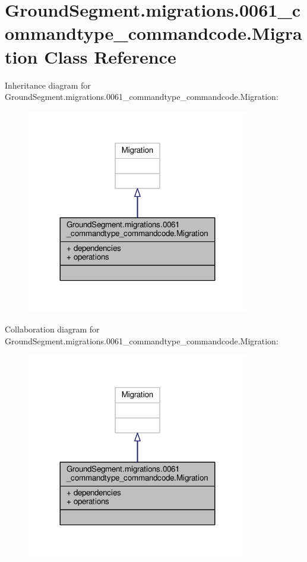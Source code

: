 \hypertarget{class_ground_segment_1_1migrations_1_10061__commandtype__commandcode_1_1_migration}{}\section{Ground\+Segment.\+migrations.0061\+\_\+commandtype\+\_\+commandcode.Migration Class Reference}
\label{class_ground_segment_1_1migrations_1_10061__commandtype__commandcode_1_1_migration}


Inheritance diagram for Ground\+Segment.\+migrations.0061\+\_\+commandtype\+\_\+commandcode.Migration\+:\nopagebreak
\begin{figure}[H]
\begin{center}
\leavevmode
\includegraphics[width=275pt]{class_ground_segment_1_1migrations_1_10061__commandtype__commandcode_1_1_migration__inherit__graph}
\end{center}
\end{figure}


Collaboration diagram for Ground\+Segment.\+migrations.0061\+\_\+commandtype\+\_\+commandcode.Migration\+:\nopagebreak
\begin{figure}[H]
\begin{center}
\leavevmode
\includegraphics[width=275pt]{class_ground_segment_1_1migrations_1_10061__commandtype__commandcode_1_1_migration__coll__graph}
\end{center}
\end{figure}

